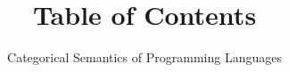 \documentclass[../main.tex]{subfiles}
\begin{document}
\title{Table of Contents}
\date{Categorical Semantics of Programming Languages}
\makehmtitle%

\renewcommand{\contentsname}{}
\tableofcontents%
\end{document}
